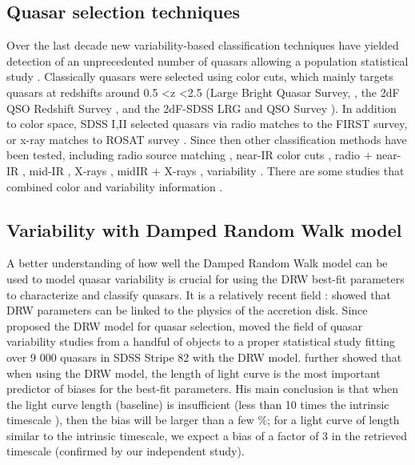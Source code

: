 \documentclass[modern]{aastex62}
\begin{document}
\subsection{Quasar selection techniques}
Over the last decade new variability-based classification techniques have yielded detection of an unprecedented number of quasars allowing a population statistical study \citep{fan2001, richards2006, kozlowski2010, palanque2011, macleod2011, graham2014, alsayyad2016, ruan2017}. Classically quasars were selected using color cuts,  which mainly targets quasars at redshifts around 0.5 \textless  z \textless 2.5 (Large Bright Quasar Survey, \citealt{hewett1995}, the 2dF QSO Redshift Survey \citealt{croom2004}, and the 2dF-SDSS LRG and QSO Survey \citealt{croom2009}).  In addition to color space, SDSS I,II selected quasars via radio matches to the FIRST survey, or x-ray matches to ROSAT survey \citep{myers2015}. Since then other classification methods have been tested, including radio source matching \citep{mcgreer2009}, near-IR color cuts \citep{banerji2012},  radio + near-IR \citep{glikman2012}, mid-IR \citep{stern2005, richards2009a, stern2012}, X-rays \citep{trichas2012},  midIR + X-rays \citep{lacy2004, hickox2007, hickox2009}, variability \citep{schmidt2010, butler2011, macleod2011, palanque2011,palanque2016}. There are some studies that combined color and variability information \citep{tie2017, peters2015, sesar2007}. 

\subsection{Variability with Damped Random Walk model}
A better understanding of how well the Damped Random Walk model can be used to model quasar variability is crucial for using the DRW best-fit parameters to characterize and classify quasars. It is a relatively recent field : \cite{kelly2009} showed that DRW parameters can be linked to the physics of the accretion disk. Since \cite{kozlowski2010} proposed the DRW model for quasar selection, \cite{macleod2010} moved the field of quasar variability studies from a handful of objects to a proper statistical study fitting over 9 000 quasars in SDSS Stripe 82 with the DRW model.  \cite{kozlowski2017a} further showed that when using the DRW model, the length of light curve is the most important predictor of biases for the best-fit parameters. His main conclusion is that when the light curve length (baseline) is insufficient (less than 10 times the intrinsic timescale ), then the bias will be larger than a few \%; for a light curve of length similar to the intrinsic timescale, we expect a bias of a factor of 3 in the retrieved timescale (confirmed by our independent study). 
\end{document}
